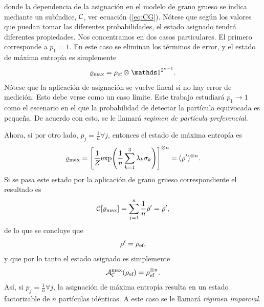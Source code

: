 

donde la dependencia de la asignación en el modelo de grano grueso se indica mediante un subíndice, $\mathcal{C}$, ver ecuación (\ref{eq:CG}). Nótese que según los valores que puedan tomar las diferentes probabilidades, el estado asignado tendrá diferentes propiedades. Nos concentramos en dos casos particulares. El primero corresponde a $p_{1}=1$. En este caso se eliminan los términos de error, y el estado de máxima entropía es simplemente
\begin{equation}\label{eq:PreferentialAss}
    \varrho_{\max}=\rho_{\ef}\otimes\Id^{2^{n-1}}.
\end{equation}
Nótese que la aplicación de asignación se vuelve lineal si no hay error de medición. Esto debe verse como un caso límite. Este trabajo estudiará $p_{1}\rightarrow 1$ como el escenario en el que la probabilidad de detectar la partícula equivocada es pequeña. De acuerdo con esto, se le llamará  \textit{regimen de partícula preferencial}.

Ahora, si por otro lado, $p_{j}=\frac{1}{n}\forall j$, entonces el estado de máxima entropía es
\begin{equation}
    \varrho_{\max}=\qty[\frac{1}{Z}\text{exp}\qty(\frac{1}{n}\sum_{k=1}^{3}\lambda_{k}\sigma_{k})]^{\otimes n}=(\rho')^{\otimes n}.\nonumber
\end{equation}
Si se pasa este estado por la aplicación de grano grueso correspondiente el resultado es 
\begin{equation}
    \mathcal{C}[\varrho_{\max}]=\sum_{j=1}^{n}\frac{1}{n}\rho'=\rho',\nonumber
\end{equation}
de  lo que se concluye que
\begin{equation*}
    \rho'=\rho_{\text{ef}},
\end{equation*}
y que por lo tanto el estado asignado es simplemente
\begin{equation}\label{eq:BoltzmannAss}
    \mathcal{A}_{\mathcal{C}}^{\max}(\rho_{\text{ef}})=\rho_{\text{ef}}^{\otimes n}.
\end{equation}
Así, si $p_{j}=\frac{1}{n}\forall j$, la asignación de máxima entropía resulta en un estado factorizable de $n$ partículas idénticas. A este caso se le llamará \textit{régimen imparcial}.



